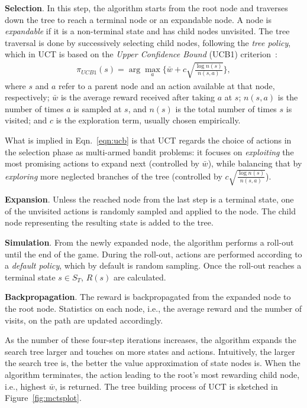 
\textbf{Selection}. In this step, the algorithm starts from the root node and traverses down the tree to reach a terminal node or an expandable node. A node is \textit{expandable} if it is a non-terminal state and has child nodes unvisited. The tree traversal is done by successively selecting child nodes, following the \textit{tree policy}, which in UCT is based on the \textit{Upper Confidence Bound} (UCB1) criterion~\cite{auer2002finite}:
    \begin{equation}
    \begin{aligned}
    \pi_{UCB1}(s) = \arg\max_a \Big\{ \bar{w} + c \sqrt{\frac{\log n(s)}{n(s, a)}} \Big\},
    \label{eqn:ucb}
    \end{aligned}
    \end{equation}
where $s$ and $a$ refer to a parent node and an action available at that node, respectively; $\bar{w}$ is the average reward received after taking $a$ at $s$; $n(s,a)$ is the number of times $a$ is sampled at $s$, and $n(s)$ is the total number of times $s$ is visited; and $c$ is the exploration term, usually chosen empirically. 

What is implied in Eqn.~\ref{eqn:ucb} is that UCT regards the choice of actions in the selection phase as multi-armed bandit problems: it focuses on \textit{exploiting} the most promising actions to expand next (controlled by $\bar{w}$), while balancing that by \textit{exploring} more neglected branches of the tree (controlled by $c \sqrt{\frac{\log n(s)}{n(s, a)}}$). 
    
\textbf{Expansion}. Unless the reached node from the last step is a terminal state, one of the unvisited actions is randomly sampled and applied to the node. The child node representing the resulting state is added to the tree.

\textbf{Simulation}. From the newly expanded node, the algorithm performs a roll-out until the end of the game. During the roll-out, actions are performed according to a \textit{default policy}, which by default is random sampling. Once the roll-out reaches a terminal state $s \in S_T$, $R(s)$ are calculated.

\textbf{Backpropagation}. The reward is backpropagated from the expanded node to the root node. Statistics on each node, i.e., the average reward and the number of visits, on the path are updated accordingly.

As the number of these four-step iterations increases, the algorithm expands the search tree larger and touches on more states and actions. Intuitively, the larger the search tree is, the better the value approximation of state nodes is. When the algorithm terminates, the action leading to the root's most rewarding child node, i.e., highest $\bar{w}$, is returned. The tree building process of UCT is sketched in Figure~\ref{fig:mctsplot}.

